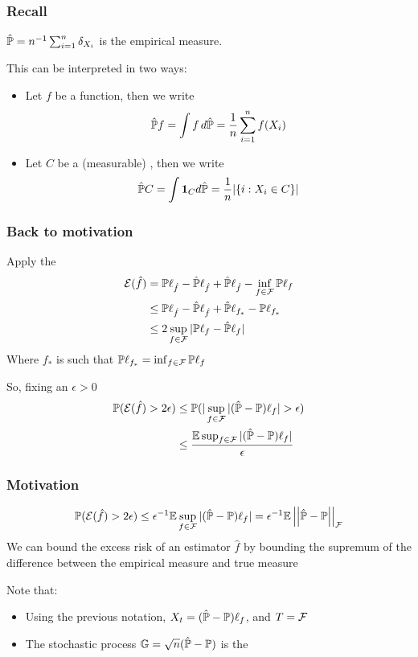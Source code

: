 \documentclass[12pt]{beamer}
\begin{document}
\begin{frame}[fragile]
\frametitle{Recall}

 $\hat{\P} = n^{-1} \sum_{i=1}^n \delta_{X_i}$ is the empirical measure.  
 
 \vsp This can be
interpreted in two ways:

\begin{itemize}
\item {} Let $f$ be a function, then we write
\[
\hat\P f = \int f \, d\hat\P = \frac{1}{n}\sum_{i=1}^n f(X_i)
\]
\item {} Let $C$ be a (measurable) , then we write
\[
\hat\P C = \int \mathbf{1}_C d\hat\P = \frac{1}{n}|\{i: X_i \in C\}|
\]
\end{itemize}

\end{frame}

\begin{frame}[fragile]
\frametitle{Back to motivation}
Apply the 
\begin{align*}
\mathcal{E}(\hat f) &  = \P\ell_{\hat{f}} - \hat\P\ell_{\hat{f}} + \hat\P\ell_{\hat{f}} - \inf_{f \in\F} \P\ell_{f} \\
& \leq \P\ell_{\hat{f}} - \hat\P\ell_{\hat{f}} + \hat\P\ell_{f_*} - \P\ell_{f_*} \\
& \leq 2\sup_{f\in\F} |\P\ell_{f} - \hat\P\ell_{f}|
\end{align*}
Where $f_*$ is such that $ \P\ell_{f_*} = \inf_{f \in\F} \P\ell_{f}$

\vsp
So, fixing an $\epsilon > 0$
\begin{align*}
\P(\mathcal{E}(\hat f) > 2\epsilon )   
& \leq 
\P( | \sup_{f \in \F} | (\hat \P - \P)\ell_f | > \epsilon) \\
& \leq
\frac{\E \sup_{f \in \F} |(\hat\P - \P)\ell_f|}{\epsilon}
\end{align*}
\end{frame}

\begin{frame}[fragile]
\frametitle{Motivation}
\[
\P(\mathcal{E}(\hat f) > 2\epsilon )    \leq
\epsilon^{-1}\E \sup_{f \in \F} |(\hat\P - \P)\ell_f|
=
\epsilon^{-1}\E \norm{\hat\P - \P}_\F
\]
We can bound the excess risk of an estimator $\hat f$ by bounding the supremum of the difference between
the empirical measure and true measure

\vsp
Note that:
\begin{itemize}
\item Using the previous notation, $X_t = (\hat \P - \P)\ell_f$, and $T = \F$

\item The stochastic process $\mathbb{G} = \sqrt{n}(\hat \P - \P)$ is the 
\end{itemize}
\end{frame}
\end{document}
